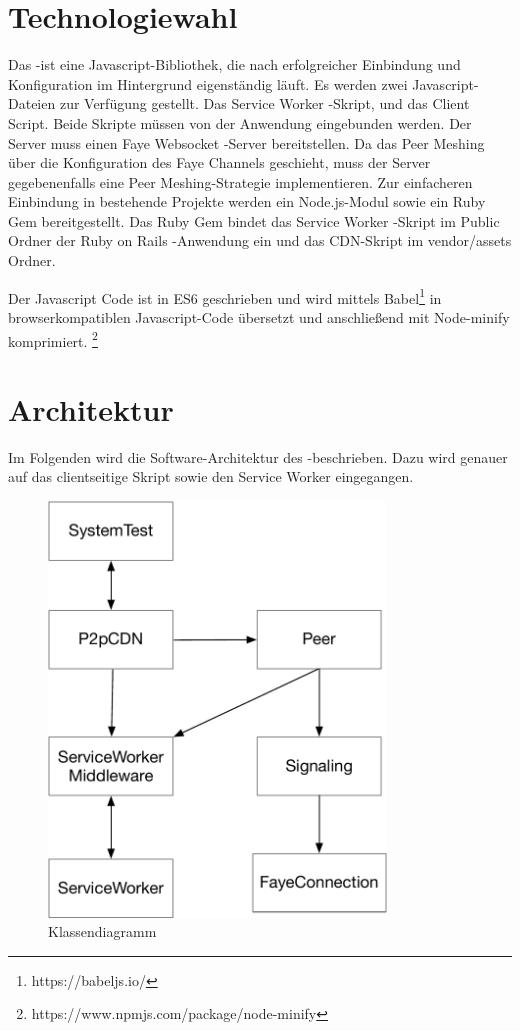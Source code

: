 \section{Technologiewahl}\label{i:Technologiewahl}
Das \pTp-\cdn ist eine Javascript-Bibliothek, die nach erfolgreicher Einbindung und Konfiguration im Hintergrund eigenständig läuft. Es werden zwei Javascript-Dateien zur Verfügung gestellt. Das Service Worker -Skript, und das \pTp \cdn Client Script. Beide Skripte müssen von der Anwendung eingebunden werden. Der Server muss einen Faye Websocket -Server bereitstellen. Da das Peer Meshing über die Konfiguration des Faye Channels geschieht, muss der Server gegebenenfalls eine Peer Meshing-Strategie implementieren. Zur einfacheren Einbindung in bestehende Projekte werden ein Node.js-Modul sowie ein Ruby Gem bereitgestellt. Das Ruby Gem bindet das Service Worker -Skript im Public Ordner der Ruby on Rails -Anwendung ein und das \pTp CDN-Skript im vendor/assets Ordner.

Der Javascript Code ist in ES6 geschrieben und wird mittels Babel\footnote{https://babeljs.io/} in browserkompatiblen Javascript-Code übersetzt und anschließend mit Node-minify komprimiert. \footnote{https://www.npmjs.com/package/node-minify}

\section{Architektur}\label{i:Architektur}
Im Folgenden wird die Software-Architektur des \pTp-\cdns beschrieben. Dazu wird genauer auf das clientseitige Skript sowie den Service Worker eingegangen. 

\begin{figure}[!h]
	\centering
	\includegraphics[width=0.8\textwidth]{figures/Klassendiagramm}
	\caption[A Figure Short-Title]{Klassendiagramm}
	\label{fig:Klassendiagramm}
\end{figure}

